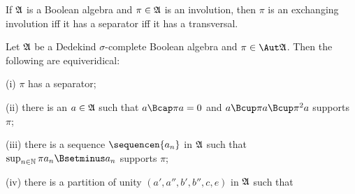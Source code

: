  If $\frak A$ is a Boolean algebra and
$\pi\in\frak A$ is an involution, then $\pi$ is an exchanging involution
iff it has a separator iff it has a transversal.


 Let $\frak A$ be a Dedekind $\sigma$-complete
Boolean algebra and $\pi\in\Aut\frak A$.   Then the following are
equiveridical:

(i) $\pi$ has a separator;

(ii) there is an $a\in\frak A$ such that $a\Bcap\pi a=0$ and
$a\Bcup\pi a\Bcup\pi^2a$ supports $\pi$;

(iii) there is a sequence $\sequencen{a_n}$ in $\frak A$ such that
$\sup_{n\in\Bbb N}\pi a_n\Bsetminus a_n$ supports $\pi$;

(iv) there is a
partition of unity $(a',a'',b',b'',c,e)$ in $\frak A$ such that


